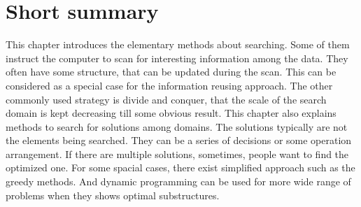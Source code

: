 \documentclass[UTF8]{article}
\begin{document}
\section{Short summary}
This chapter introduces the elementary methods about searching. Some of them instruct
the computer to scan for interesting information among the data. They often have
some structure, that can be updated during the scan. This can be considered
as a special case for the information reusing approach. The other commonly used
strategy is divide and conquer, that the scale of the search domain is
kept decreasing till some obvious result. This chapter also explains methods
to search for solutions among domains. The solutions typically are not
the elements being searched. They can be a series of decisions or some
operation arrangement. If there are multiple solutions, sometimes, people want
to find the optimized one. For some spacial cases, there exist simplified
approach such as the greedy methods. And dynamic programming can be used
for more wide range of problems when they shows optimal substructures.
\end{document}
